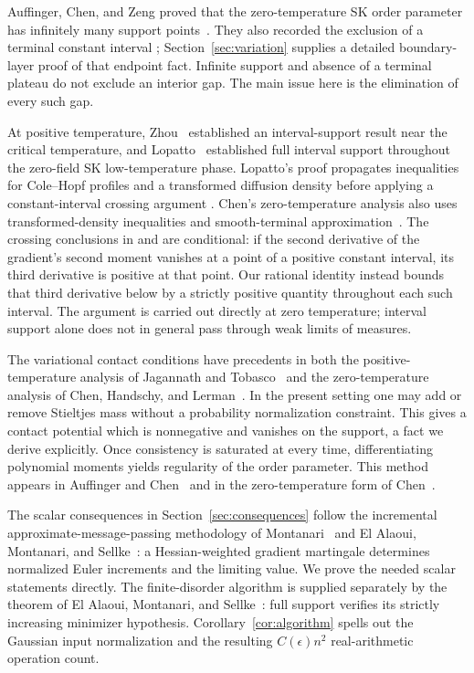 \documentclass[11pt]{article}
\theoremstyle{remark}
\numberwithin{equation}{section}
\begin{document}
Auffinger, Chen, and Zeng proved that the zero-temperature SK order
parameter has infinitely many support points~\cite[Theorem~1]{ACZ2017}.
They also recorded the exclusion of a terminal constant interval
\cite[Remark~7]{ACZ2017}; Section~\ref{sec:variation} supplies a detailed
boundary-layer proof of that endpoint fact. Infinite support and absence
of a terminal plateau do not exclude an interior gap. The main issue
here is the elimination of every such gap.

At positive temperature, Zhou~\cite[Theorem~1]{Zhou2026} established
an interval-support result near the critical temperature, and
Lopatto~\cite[Theorem~1.1]{Lopatto2026} established full interval support
throughout the zero-field SK low-temperature phase. Lopatto's proof
propagates inequalities for Cole--Hopf profiles and a transformed
diffusion density before applying a constant-interval crossing argument
\cite[Sections~3, 7--9]{Lopatto2026}. Chen's zero-temperature analysis
also uses transformed-density inequalities and smooth-terminal
approximation~\cite[Propositions~3.7 and 3.11]{Chen2026}.
The crossing conclusions in \cite[Proposition~9.1]{Lopatto2026} and
\cite[Proposition~4.2]{Chen2026} are conditional: if the second derivative
of the gradient's second moment vanishes at a point of a positive constant
interval, its third derivative is positive at that point. Our rational identity instead bounds
that third derivative below by a strictly positive quantity throughout
each such interval. The argument is carried out directly at zero
temperature; interval support alone does not in general pass through
weak limits of measures.

The variational contact conditions have precedents in both the
positive-temperature analysis of Jagannath and
Tobasco~\cite[Proposition~1.1, Lemma~3.2, and Corollaries~3.6 and 3.10]{JT2017}
and the zero-temperature analysis of Chen, Handschy, and
Lerman~\cite[Propositions~3--4]{CHL2018}. In the present setting one may
add or remove Stieltjes mass without a probability normalization constraint.
This gives a contact potential which is nonnegative and vanishes on the
support, a fact we derive explicitly.
Once consistency is saturated at every time, differentiating polynomial
moments yields regularity of the order parameter. This method appears in
Auffinger and Chen~\cite[Lemma~2 and the proof of Theorem~2(ii)]{ACProperties2015}
and in the zero-temperature form of Chen~\cite[Appendix~B.6]{Chen2026}.

The scalar consequences in Section~\ref{sec:consequences} follow the
incremental approximate-message-passing methodology of
Montanari~\cite{Montanari2019} and El Alaoui, Montanari, and
Sellke~\cite{EAMS2021}: a Hessian-weighted gradient martingale determines
normalized Euler increments and the limiting value. We prove the needed
scalar statements directly. The finite-disorder algorithm is supplied
separately by the theorem of El Alaoui, Montanari, and
Sellke~\cite[Theorem~3 and Corollary~2.2 of the cited preprint]{EAMS2021}:
full support verifies its strictly increasing minimizer hypothesis.
Corollary~\ref{cor:algorithm} spells out the Gaussian input normalization
and the resulting $C(\epsilon)n^2$ real-arithmetic operation count.
\end{document}
